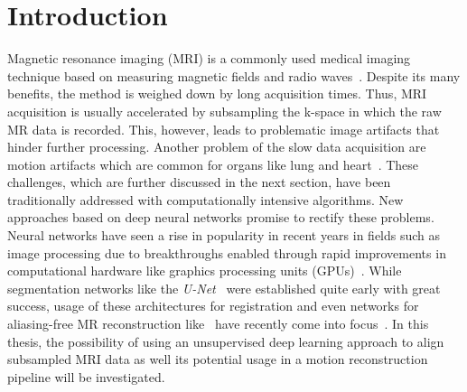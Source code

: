 
\chapter{Introduction} \label{Ch:Introduction}
Magnetic resonance imaging (MRI) is a commonly used medical imaging technique based on measuring magnetic fields and radio waves~\cite{Brown2014,Serai2021,Singh2023}. 
Despite its many benefits, the method is weighed down by long acquisition times.
Thus, MRI acquisition is usually accelerated by subsampling the k-space in which the raw MR data is recorded. This, however, leads to problematic image artifacts that hinder further processing. Another problem of the slow data acquisition are motion artifacts which are common for organs like lung and heart~\cite{Chen2022}. 
These challenges, which are further discussed in the next section, have been traditionally addressed with computationally intensive algorithms.
New approaches based on deep neural networks promise to rectify these problems. Neural networks have seen a rise in popularity in recent years in fields such as image processing due to breakthroughs enabled through rapid improvements in computational hardware like graphics processing units (GPUs)~\cite{Chen2020}. While segmentation networks like the \emph{U-Net}~\cite{U-Net} were established quite early with great success, usage of these architectures for registration and even networks for aliasing-free MR reconstruction like~\cite{Kuestner2022,Ghoul2024,Pan2024} have recently come into focus~\cite{Chen2020,Haskins2020}. %
In this thesis, the possibility of using an unsupervised deep learning approach to align subsampled MRI data as well its potential usage in a motion reconstruction pipeline will be investigated.
